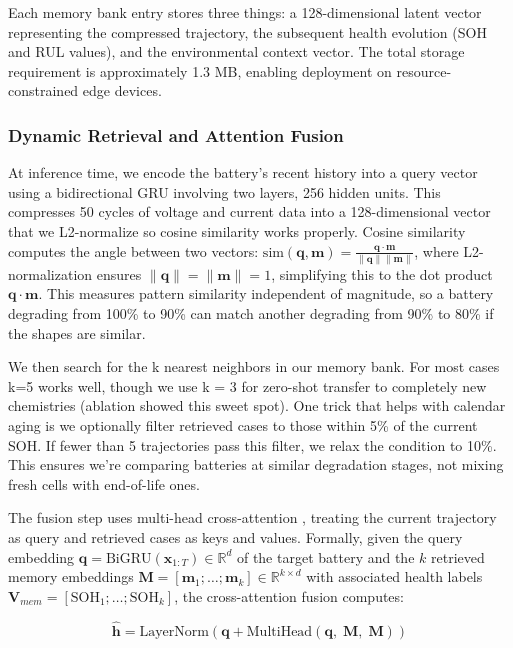 \documentclass[5p,times,authoryear]{elsarticle}
\begin{document}
Each memory bank entry stores three things: a 128-dimensional latent vector representing the compressed trajectory, the subsequent health evolution (SOH and RUL values), and the environmental context vector. The total storage requirement is approximately 1.3 MB, enabling deployment on resource-constrained edge devices.

\subsubsection{Dynamic Retrieval and Attention Fusion}

At inference time, we encode the battery's recent history into a query vector using a bidirectional GRU \citep{cho2014learning} involving two layers, 256 hidden units. This compresses 50 cycles of voltage and current data into a 128-dimensional vector that we L2-normalize so cosine similarity works properly. Cosine similarity computes the angle between two vectors: $\text{sim}(\mathbf{q}, \mathbf{m}) = \frac{\mathbf{q} \cdot \mathbf{m}}{\|\mathbf{q}\| \|\mathbf{m}\|}$, where L2-normalization ensures $\|\mathbf{q}\| = \|\mathbf{m}\| = 1$, simplifying this to the dot product $\mathbf{q} \cdot \mathbf{m}$. This measures pattern similarity independent of magnitude, so a battery degrading from 100\% to 90\% can match another degrading from 90\% to 80\% if the shapes are similar.

We then search for the k nearest neighbors in our memory bank. For most cases k=5 works well, though we use k = 3 for zero-shot transfer to completely new chemistries (ablation showed this sweet spot). One trick that helps with calendar aging is we optionally filter retrieved cases to those within 5\% of the current SOH. If fewer than 5 trajectories pass this filter, we relax the condition to 10\%. This ensures we're comparing batteries at similar degradation stages, not mixing fresh cells with end-of-life ones.

The fusion step uses multi-head cross-attention \citep{vaswani2017attention}, treating the current trajectory as query and retrieved cases as keys and values. Formally, given the query embedding $\mathbf{q} = \text{BiGRU}(\mathbf{x}_{1:T}) \in \mathbb{R}^{d}$ of the target battery and the $k$ retrieved memory embeddings $\mathbf{M} = [\mathbf{m}_1; \ldots; \mathbf{m}_k] \in \mathbb{R}^{k \times d}$ with associated health labels $\mathbf{V}_{mem} = [\text{SOH}_1; \ldots; \text{SOH}_k]$, the cross-attention fusion computes:

\begin{equation}
\hat{\mathbf{h}} = \text{LayerNorm}\!\left(\mathbf{q} + \text{MultiHead}(\mathbf{q},\;\mathbf{M},\;\mathbf{M})\right)
\label{eq:hero_cross_attn}
\end{equation}
\end{document}
